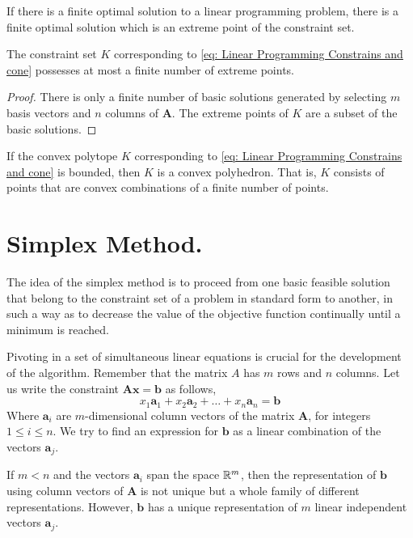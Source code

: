 \begin{corollary}
If there is a finite optimal solution to a linear programming problem, there is a finite optimal solution which is an extreme point of the constraint set.
\end{corollary}

\begin{corollary}
The constraint set $K$ corresponding to \eqref{eq: Linear Programming Constrains and cone} possesses at most a finite number of extreme points.
	\begin{proof}
	There is only a finite number of basic solutions generated by selecting $m$ basis vectors and $n$ columns of $\mathbf{A}$. The extreme points of $K$ are a subset of the basic solutions.
	\end{proof}
\end{corollary}

\begin{corollary}
	If the convex polytope $K$ corresponding to \eqref{eq: Linear Programming Constrains and cone} is bounded, then $K$ is a convex polyhedron. That is, $K$ consists of points that are convex combinations of a finite number of points.
\end{corollary}

\section{Simplex Method.}

The idea of the simplex method is to proceed from one basic feasible solution that belong to the constraint set of a problem in standard form to another, in such a way as to decrease the value of the objective function continually until a minimum is reached. 

Pivoting in a set of simultaneous linear equations is crucial for the development of the algorithm. Remember that the matrix $A$ has $m$ rows and $n$ columns. Let us write the constraint $\mathbf{Ax}=\mathbf{b}$ as follows,
\begin{equation*}
x_1\mathbf{a}_1+x_2\mathbf{a}_2+\dots+x_n\mathbf{a}_n=\mathbf{b}
\end{equation*}
Where $\mathbf{a}_i$ are $m$-dimensional column vectors of the matrix $\mathbf{A}$, for integers $1\leq i\leq n$. We try to find an expression for $\mathbf{b}$ as a linear combination of the vectors $\mathbf{a}_j$. 

If $m<n$ and the vectors $\mathbf{a}_i$ span the space $\mathbb{R}^m$, then the representation of $\mathbf{b}$ using column vectors of $\mathbf{A}$ is not unique but a whole family of different representations. However, $\mathbf{b}$ has a unique representation of $m$ linear independent vectors $\mathbf{a}_j$. 

